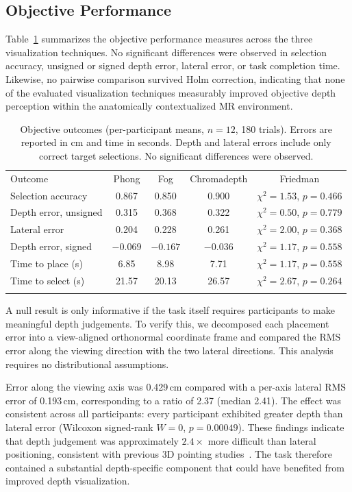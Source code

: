 \documentclass[runningheads]{llncs}
\begin{document}
\subsection{Objective Performance}

Table~\ref{tab:perf} summarizes the objective performance measures across the three visualization techniques. No significant differences were observed in selection accuracy, unsigned or signed depth error, lateral error, or task completion time. Likewise, no pairwise comparison survived Holm correction, indicating that none of the evaluated visualization techniques measurably improved objective depth perception within the anatomically contextualized MR environment.

\begin{table}[ht]
\caption{Objective outcomes (per-participant means, $n=12$, 180 trials). Errors are reported in cm and time in seconds. Depth and lateral errors include only correct target selections. No significant differences were observed.}
\label{tab:perf}
\centering
\begin{tabular}{lcccc}
\hline\noalign{\smallskip}
Outcome & Phong & Fog & Chromadepth & Friedman \\
\noalign{\smallskip}\hline\noalign{\smallskip}
Selection accuracy      & 0.867 & 0.850 & 0.900 & $\chi^2=1.53$, $p=0.466$ \\
Depth error, unsigned   & 0.315 & 0.368 & 0.322 & $\chi^2=0.50$, $p=0.779$ \\
Lateral error           & 0.204 & 0.228 & 0.261 & $\chi^2=2.00$, $p=0.368$ \\
Depth error, signed     & $-0.069$ & $-0.167$ & $-0.036$ & $\chi^2=1.17$, $p=0.558$ \\
Time to place (s)       & 6.85  & 8.98  & 7.71  & $\chi^2=1.17$, $p=0.558$ \\
Time to select (s)      & 21.57 & 20.13 & 26.57 & $\chi^2=2.67$, $p=0.264$ \\
\noalign{\smallskip}\hline
\end{tabular}
\end{table}

A null result is only informative if the task itself requires participants to make meaningful depth judgements. To verify this, we decomposed each placement error into a view-aligned orthonormal coordinate frame and compared the RMS error along the viewing direction with the two lateral directions. This analysis requires no distributional assumptions.

Error along the viewing axis was 0.429\,cm compared with a per-axis lateral RMS error of 0.193\,cm, corresponding to a ratio of 2.37 (median 2.41). The effect was consistent across all participants: every participant exhibited greater depth than lateral error (Wilcoxon signed-rank $W=0$, $p=0.00049$). These findings indicate that depth judgement was approximately $2.4\times$ more difficult than lateral positioning, consistent with previous 3D pointing studies~\cite{teather_pointing_2011,batmaz_effect_2022}. The task therefore contained a substantial depth-specific component that could have benefited from improved depth visualization.
\end{document}

